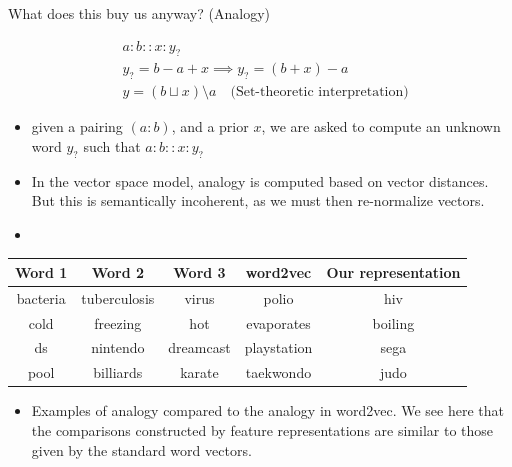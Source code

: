 \documentclass[8pt]{beamer}
\begin{document}
\begin{frame}{What does this buy us anyway? (Analogy)}

\begin{equation*}
\begin{split}
    &a : b :: x : y_? \\
    &y_? = b - a + x \implies y_? = (b + x) - a \\
    &y = (b \sqcup x) \setminus a \quad \text{(Set-theoretic interpretation)}
\end{split}
\end{equation*}


\begin{itemize}
\item given a pairing $(a : b)$, and a prior $x$, we are asked to compute an unknown
word $y_?$ such that  $a:b::x:y_?$
\item In the vector space model, analogy is computed based on vector distances. But this is semantically incoherent, as we must then re-normalize vectors.
\item 
\end{itemize}
\begin{tabular}{ccc|c|c}
    \bf Word 1  & \bf Word 2    & \bf Word 3    & \bf word2vec  & \bf Our representation    \\ \hline
    bacteria    & tuberculosis  & virus         & polio         & hiv                       \\
    cold        & freezing      & hot           & evaporates    & boiling                   \\
    ds          & nintendo      & dreamcast     & playstation   & sega                      \\
    pool        & billiards     & karate        & taekwondo     & judo                      \\
\end{tabular}
\begin{itemize}
  \item Examples of analogy compared to the analogy in word2vec. We see here that the comparisons constructed by feature representations are similar to those given by the standard word vectors.
\end{itemize}
\end{frame}
\end{document}
